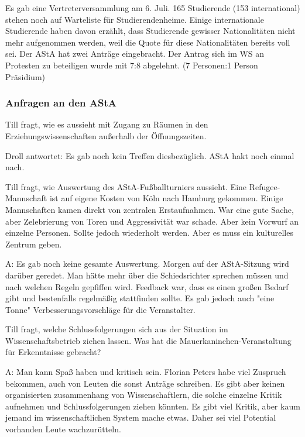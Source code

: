 \documentclass[ngerman,headheight=70pt]{scrartcl}
\begin{document}
    Es gab eine Vertreterversammlung am 6. Juli. 165 Studierende (153 international)
    stehen noch auf Warteliste für Studierendenheime. Einige internationale
    Studierende haben davon erzählt, dass Studierende gewisser Nationalitäten
    nicht mehr aufgenommen werden, weil die Quote für diese Nationalitäten bereits
    voll sei. Der AStA hat zwei Anträge eingebracht. Der Antrag sich im WS
    an Protesten zu beteiligen wurde mit 7:8 abgelehnt. (7 Personen:1 Person Präsidium)

    \subsubsection{Anfragen an den AStA}

    Till fragt, wie es aussieht mit Zugang zu Räumen in den Erziehungswissenschaften
    außerhalb der Öffnungszeiten.

    Droll antwortet: Es gab noch kein Treffen diesbezüglich. AStA hakt noch
    einmal nach.

    Till fragt, wie Auswertung des AStA-Fußballturniers aussieht.
    Eine Refugee-Mannschaft ist auf eigene Kosten von Köln nach Hamburg
    gekommen. Einige Mannschaften kamen direkt von zentralen
    Erstaufnahmen. War eine gute Sache, aber Zelebrierung von Toren
    und Aggressivität war schade. Aber kein Vorwurf an einzelne Personen.
    Sollte jedoch wiederholt werden. Aber es muss ein kulturelles
    Zentrum geben.

    A: Es gab noch keine gesamte Auswertung. Morgen auf der AStA-Sitzung
    wird darüber geredet. Man hätte mehr über die Schiedsrichter sprechen
    müssen und nach welchen Regeln gepfiffen wird. Feedback war, dass es
    einen großen Bedarf gibt und bestenfalls regelmäßig stattfinden sollte.
    Es gab jedoch auch "eine Tonne" Verbesserungsvorschläge für die Veranstalter.

    Till fragt, welche Schlussfolgerungen sich aus der Situation im
    Wissenschaftsbetrieb ziehen lassen. Was hat die Mauerkaninchen-Veranstaltung
    für Erkenntnisse gebracht?

    A: Man kann Spaß haben und kritisch sein. Florian Peters habe viel Zuspruch
    bekommen, auch von Leuten die sonst Anträge schreiben. Es gibt aber keinen
    organisierten zusammenhang von Wissenschaftlern, die solche einzelne
    Kritik aufnehmen und Schlussfolgerungen ziehen könnten. Es gibt viel Kritik,
    aber kaum jemand im wissenschaftlichen System mache etwas. Daher sei viel
    Potential vorhanden Leute wachzurütteln.
\end{document}
